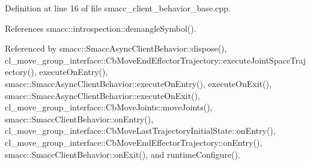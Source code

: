 Definition at line 16 of file smacc\+\_\+client\+\_\+behavior\+\_\+base.\+cpp.



References smacc\+::introspection\+::demangle\+Symbol().



Referenced by smacc\+::\+Smacc\+Async\+Client\+Behavior\+::dispose(), cl\+\_\+move\+\_\+group\+\_\+interface\+::\+Cb\+Move\+End\+Effector\+Trajectory\+::execute\+Joint\+Space\+Trajectory(), execute\+On\+Entry(), smacc\+::\+Smacc\+Async\+Client\+Behavior\+::execute\+On\+Entry(), execute\+On\+Exit(), smacc\+::\+Smacc\+Async\+Client\+Behavior\+::execute\+On\+Exit(), cl\+\_\+move\+\_\+group\+\_\+interface\+::\+Cb\+Move\+Joints\+::move\+Joints(), smacc\+::\+Smacc\+Client\+Behavior\+::on\+Entry(), cl\+\_\+move\+\_\+group\+\_\+interface\+::\+Cb\+Move\+Last\+Trajectory\+Initial\+State\+::on\+Entry(), cl\+\_\+move\+\_\+group\+\_\+interface\+::\+Cb\+Move\+End\+Effector\+Trajectory\+::on\+Entry(), smacc\+::\+Smacc\+Client\+Behavior\+::on\+Exit(), and runtime\+Configure().


